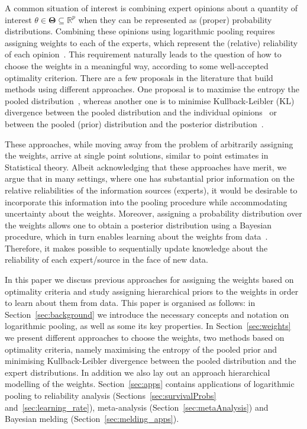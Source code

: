 \documentclass[a4paper, notitlepage, 10pt]{article}
\begin{document}
A common situation of interest is combining expert opinions about a quantity of interest $\theta \in \mathbf{\Theta} \subseteq \mathbb{R}^p$ when they can be represented as (proper) probability distributions.
Combining these opinions using logarithmic pooling requires assigning weights to each of the experts, which represent the (relative) reliability of each opinion~\citep{Genest1984}.
This requirement naturally leads to the question of how to choose the weights in a meaningful way, according to some well-accepted optimality criterion.
There are a few proposals in the literature that build methods using different approaches.
One proposal is to maximise the entropy the pooled distribution~\citep{Myung1996}, whereas another one is to minimise Kullback-Leibler (KL) divergence between the pooled distribution and the individual opinions~\citep{Abbas2009} or between the pooled (prior) distribution and the posterior distribution~\citep{Rufo2012A,Rufo2012B}.

These approaches, while moving away from the problem of arbitrarily assigning the weights, arrive at single point solutions, similar to point estimates in Statistical theory.
Albeit acknowledging that these approaches have merit, we argue that in many settings, where one has substantial prior information on the relative reliabilities of the information sources (experts), it would be desirable to incorporate this information into the pooling procedure while accommodating uncertainty about the weights.
Moreover, assigning a probability distribution over the weights allows one to obtain a posterior distribution using a Bayesian procedure, which in turn enables learning about the weights from data~\citep{Poole2000}.
Therefore, it makes possible to sequentially update knowledge about the reliability of each expert/source in the face of new data.

In this paper we discuss previous approaches for assigning the weights based on optimality criteria and study assigning hierarchical priors to the weights in order to learn about them from data.
This paper is organised as follows: in Section~\ref{sec:background} we introduce the necessary concepts and notation on logarithmic pooling, as well as some its key properties.
In Section~\ref{sec:weights} we present different approaches to choose the weights, two methods based on optimality criteria, namely maximising the entropy of the pooled prior and minimising Kullback-Leibler divergence between the pooled distribution and the expert distributions.
In addition we also lay out an approach hierarchical modelling of the weights.
Section~\ref{sec:apps} contains applications of logarithmic pooling to reliability analysis (Sections~\ref{sec:survivalProbs} and~\ref{sec:learning_rate}), meta-analysis (Section~\ref{sec:metaAnalysis}) and Bayesian melding (Section~\ref{sec:melding_apps}).
\end{document}
